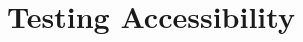 \documentclass{xourse}
\title{Testing Accessibility}
\begin{document}
\begin{abstract}
\end{abstract}
\maketitle


   
\end{document}

